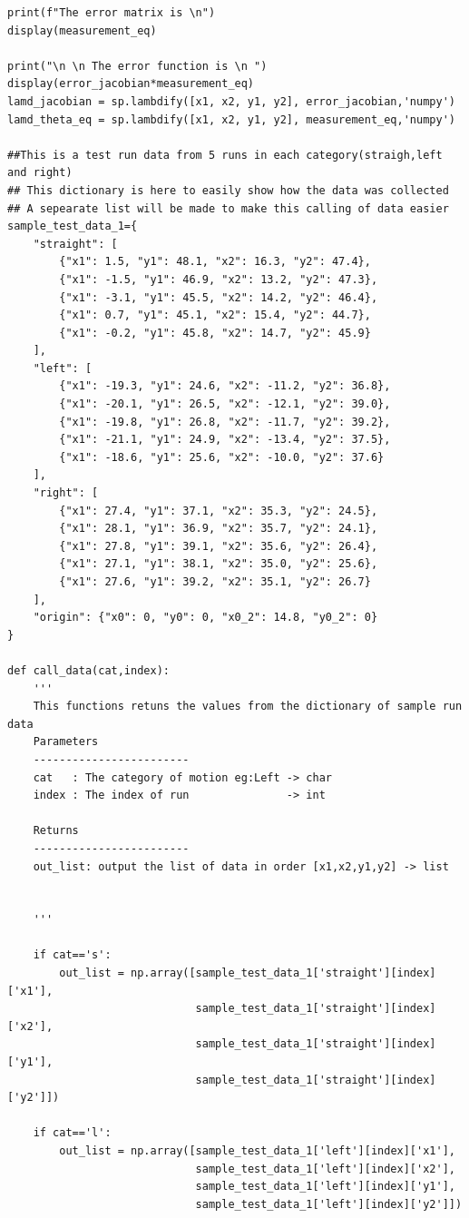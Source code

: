 {\begin{itemize}
\begin{verbatim}
print(f"The error matrix is \n")
display(measurement_eq)

print("\n \n The error function is \n ")
display(error_jacobian*measurement_eq)
lamd_jacobian = sp.lambdify([x1, x2, y1, y2], error_jacobian,'numpy')
lamd_theta_eq = sp.lambdify([x1, x2, y1, y2], measurement_eq,'numpy')

##This is a test run data from 5 runs in each category(straigh,left and right)
## This dictionary is here to easily show how the data was collected 
## A sepearate list will be made to make this calling of data easier
sample_test_data_1={
    "straight": [
        {"x1": 1.5, "y1": 48.1, "x2": 16.3, "y2": 47.4},
        {"x1": -1.5, "y1": 46.9, "x2": 13.2, "y2": 47.3},
        {"x1": -3.1, "y1": 45.5, "x2": 14.2, "y2": 46.4},
        {"x1": 0.7, "y1": 45.1, "x2": 15.4, "y2": 44.7},
        {"x1": -0.2, "y1": 45.8, "x2": 14.7, "y2": 45.9}
    ],
    "left": [
        {"x1": -19.3, "y1": 24.6, "x2": -11.2, "y2": 36.8},
        {"x1": -20.1, "y1": 26.5, "x2": -12.1, "y2": 39.0},
        {"x1": -19.8, "y1": 26.8, "x2": -11.7, "y2": 39.2},
        {"x1": -21.1, "y1": 24.9, "x2": -13.4, "y2": 37.5},
        {"x1": -18.6, "y1": 25.6, "x2": -10.0, "y2": 37.6}
    ],
    "right": [
        {"x1": 27.4, "y1": 37.1, "x2": 35.3, "y2": 24.5},
        {"x1": 28.1, "y1": 36.9, "x2": 35.7, "y2": 24.1},
        {"x1": 27.8, "y1": 39.1, "x2": 35.6, "y2": 26.4},
        {"x1": 27.1, "y1": 38.1, "x2": 35.0, "y2": 25.6},
        {"x1": 27.6, "y1": 39.2, "x2": 35.1, "y2": 26.7}
    ],
    "origin": {"x0": 0, "y0": 0, "x0_2": 14.8, "y0_2": 0}
}

def call_data(cat,index):
    '''
    This functions retuns the values from the dictionary of sample run data
    Parameters
    ------------------------
    cat   : The category of motion eg:Left -> char
    index : The index of run               -> int
    
    Returns
    ------------------------
    out_list: output the list of data in order [x1,x2,y1,y2] -> list
    
    
    '''
    
    if cat=='s':
        out_list = np.array([sample_test_data_1['straight'][index]['x1'],
                             sample_test_data_1['straight'][index]['x2'],
                             sample_test_data_1['straight'][index]['y1'],
                             sample_test_data_1['straight'][index]['y2']])
        
    if cat=='l':
        out_list = np.array([sample_test_data_1['left'][index]['x1'],
                             sample_test_data_1['left'][index]['x2'],
                             sample_test_data_1['left'][index]['y1'],
                             sample_test_data_1['left'][index]['y2']])
        

\end{verbatim}
\end{itemize}}
